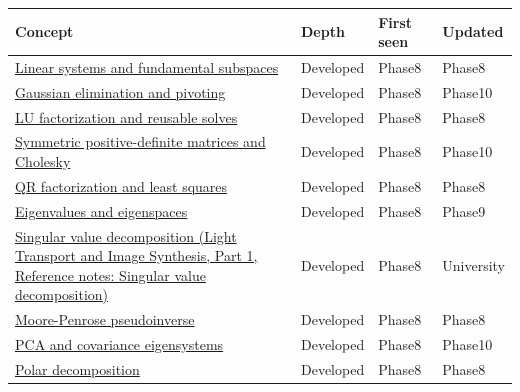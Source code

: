 {\def\LTcaptype{none} %
\begin{longtable}[]{@{}
  >{\raggedright\arraybackslash}p{}
  >{\raggedright\arraybackslash}p{}
  >{\raggedright\arraybackslash}p{}
  >{\raggedright\arraybackslash}p{}@{}}
\toprule\noalign{}
\begin{minipage}[b]{\linewidth}\raggedright
Concept
\end{minipage} & \begin{minipage}[b]{\linewidth}\raggedright
Depth
\end{minipage} & \begin{minipage}[b]{\linewidth}\raggedright
First seen
\end{minipage} & \begin{minipage}[b]{\linewidth}\raggedright
Updated
\end{minipage} \\
\midrule\noalign{}
\endhead
\bottomrule\noalign{}
\endlastfoot
\hyperref[appendix-8572a4a060c1]{Linear systems and fundamental subspaces} & Developed & Phase8 & Phase8 \\
\hyperref[appendix-f6e77f4a200f]{Gaussian elimination and pivoting} & Developed & Phase8 & Phase10 \\
\hyperref[appendix-55e4b5b0a1e6]{LU factorization and reusable solves} & Developed & Phase8 & Phase8 \\
\hyperref[appendix-50d2ea3c9b26]{Symmetric positive-definite matrices and Cholesky} & Developed & Phase8 & Phase10 \\
\hyperref[appendix-c3421e6b4f2c]{QR factorization and least squares} & Developed & Phase8 & Phase8 \\
\hyperref[appendix-0b3be18411f9]{Eigenvalues and eigenspaces} & Developed & Phase8 & Phase9 \\
\href{../04-Light-Transport-and-Image-Synthesis-P01/main.pdf\#nameddest=appendix-1fad5e7f36fa}{Singular value decomposition (Light Transport and Image Synthesis, Part 1, Reference notes: Singular value decomposition)} & Developed & Phase8 & University \\
\hyperref[appendix-541306fdbc1b]{Moore-Penrose pseudoinverse} & Developed & Phase8 & Phase8 \\
\hyperref[appendix-ad175ef3c5bf]{PCA and covariance eigensystems} & Developed & Phase8 & Phase10 \\
\hyperref[appendix-73f5bcf7a462]{Polar decomposition} & Developed & Phase8 & Phase8 \\

\end{longtable}}
